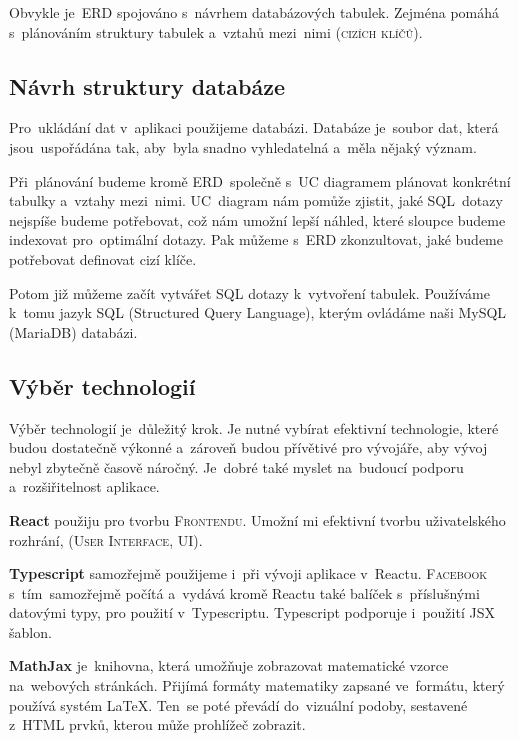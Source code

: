 \documentclass[14pt,a4paper]{article}
\begin{document}
        Obvykle je~\textsc{ERD} spojováno s~návrhem databázových tabulek. Zejména pomáhá s~plánováním struktury tabulek a~vztahů mezi~nimi (\textsc{cizích klíčů}).
        \parencite{vertabeloERD}

        \subsection{Návrh struktury databáze}
        Pro~ukládání dat v~aplikaci použijeme databázi. Databáze je~soubor dat, která jsou~uspořádána tak, aby~byla snadno vyhledatelná a~měla nějaký význam.

        Při~plánování budeme kromě ERD~společně s~UC diagramem plánovat konkrétní tabulky a~vztahy mezi~nimi. UC~diagram nám pomůže zjistit, jaké SQL~dotazy nejspíše budeme potřebovat, což nám umožní lepší náhled, které sloupce budeme indexovat pro~optimální dotazy.
        Pak můžeme s~ERD zkonzultovat, jaké budeme potřebovat definovat cizí klíče.

        Potom již můžeme začít vytvářet SQL dotazy k~vytvoření tabulek. Používáme k~tomu jazyk \textsc{SQL} (Structured Query Language), kterým ovládáme naši MySQL (MariaDB) databázi.

        \subsection{Výběr technologií}
            Výběr technologií je~důležitý krok. Je nutné vybírat efektivní technologie, které budou dostatečně výkonné a~zároveň budou
            přívětivé pro vývojáře, aby vývoj nebyl zbytečně časově náročný. Je~dobré také myslet na~budoucí podporu a~rozšiřitelnost aplikace.

            \textbf{React} použiju pro tvorbu \textsc{Frontendu}. Umožní mi efektivní tvorbu uživatelského rozhrání, (\textsc{User Interface, UI}).

            \textbf{Typescript} samozřejmě použijeme i~při vývoji aplikace v~Reactu. \textsc{Facebook} s~tím~samozřejmě počítá a~vydává
            kromě Reactu také balíček s~příslušnými datovými typy, pro použití v~Typescriptu. Typescript podporuje i~použití JSX šablon. \parencite[Refeerence/Handbook/JSX]{TypeScript}

            \textbf{MathJax} je~knihovna, která umožňuje zobrazovat matematické vzorce na~webových stránkách.
            Přijímá formáty matematiky zapsané ve~formátu, který používá systém \LaTeX. Ten~se poté převádí do~vizuální podoby, sestavené z~HTML prvků, kterou může prohlížeč zobrazit.
            
\end{document}
